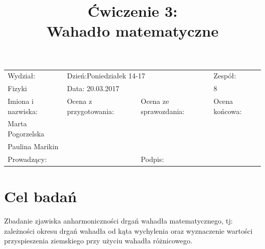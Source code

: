 \documentclass[a4paper,10pt]{article}
\def\arraystretch{1.2}
\begin{document}
\begin{table}
  \centering
  \def\arraystretch{1.5}
    \begin{tabular}{|l|l|l|l|} \hline
    Wydział:           & \multicolumn{2}{l|}{Dzień:Poniedziałek 14-17}    &Zespół:  \\
    Fizyki             &    \multicolumn{2}{l|}{Data: 20.03.2017}         &8             \\\hline
    Imiona i nazwiska: &Ocena z przygotowania:  &Ocena ze sprawozdania:   &Ocena końcowa: \\
    Marta Pogorzelska  &                        &                         &                \\
    Paulina Marikin    &                        &                         &\\\hline
    \multicolumn{2}{|l|}{Prowadzący:                 } &\multicolumn{2}{l|}{Podpis:             }  \\\hline
  \end{tabular}
\end{table}


\title{Ćwiczenie 3:\\Wahadło matematyczne}
\date{}
\maketitle{}

\section{Cel badań}
Zbadanie zjawiska anharmoniczności drgań wahadła matematycznego, tj: zależności okresu drgań wahadła od kąta wychylenia oraz wyznaczenie wartości przyspieszenia ziemskiego przy użyciu wahadła różnicowego.
\end{document}
